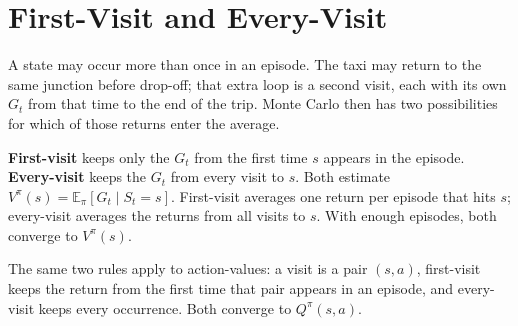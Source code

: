 \section{First-Visit and Every-Visit}

A state may occur more than once in an episode. The taxi may return to the same junction before drop-off; that extra loop is a second visit, each with its own $G_t$ from that time to the end of the trip. Monte Carlo then has two possibilities for which of those returns enter the average.

\textbf{First-visit} keeps only the $G_t$ from the first time $s$ appears in the episode. \textbf{Every-visit} keeps the $G_t$ from every visit to $s$. Both estimate $V^\pi(s)=\mathbb{E}_\pi[G_t\mid S_t=s]$. First-visit averages one return per episode that hits $s$; every-visit averages the returns from all visits to $s$. With enough episodes, both converge to $V^\pi(s)$.

The same two rules apply to action-values: a visit is a pair $(s,a)$, first-visit keeps the return from the first time that pair appears in an episode, and every-visit keeps every occurrence. Both converge to $Q^\pi(s,a)$.

